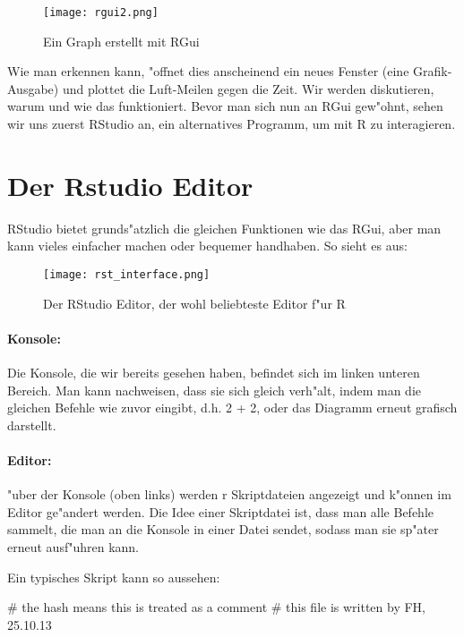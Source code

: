 \documentclass[a4paper,twoside]{tufte-book}\usepackage[]{graphicx}\usepackage[]{color}
\begin{document}
\begin{appendices}
\begin{figure}[]
\begin{center}
\texttt{[image: rgui2.png]}
\caption{Ein Graph erstellt mit RGui}
\label{fig: Rgui2}
\end{center}
\end{figure}

Wie man erkennen kann, "offnet dies anscheinend ein neues Fenster (eine Grafik-Ausgabe) und plottet die Luft-Meilen gegen die Zeit. Wir werden diskutieren, warum und wie das funktioniert. Bevor man sich nun an RGui gew"ohnt, sehen wir uns zuerst RStudio an, ein alternatives Programm, um mit R zu interagieren.

\section{Der Rstudio Editor}
 
RStudio bietet grunds"atzlich die gleichen Funktionen wie das RGui, aber man kann vieles einfacher machen oder bequemer handhaben. So sieht es aus:

\begin{figure}[]
\begin{center}
\texttt{[image: rst\_interface.png]}
\caption{Der RStudio Editor, der wohl beliebteste Editor f"ur R}
\label{fig: Rstudio}
\end{center}
\end{figure}


\paragraph{Konsole:} Die Konsole, die wir bereits gesehen haben, befindet sich im linken unteren Bereich. Man kann nachweisen, dass sie sich gleich verh"alt, indem man die gleichen Befehle wie zuvor eingibt, d.h. 2 + 2, oder das Diagramm erneut grafisch darstellt.

\paragraph{Editor:} "uber der Konsole (oben links) werden r Skriptdateien angezeigt und k"onnen im Editor ge"andert werden. Die Idee einer Skriptdatei ist, dass man alle Befehle sammelt, die man an die Konsole in einer Datei sendet, sodass man sie sp"ater erneut ausf"uhren kann.  

Ein typisches Skript kann so aussehen:

\begin{Schunk}
\begin{Sinput}
# the hash means this is treated as a comment
# this file is written by FH, 25.10.13


\end{Sinput}
\end{Schunk}
\end{appendices}
\end{document}
